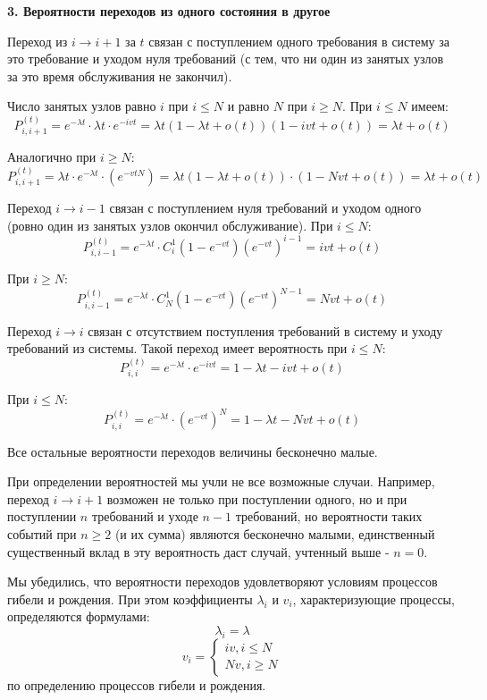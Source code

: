 \documentclass[aps,%
12pt,%
final,%
oneside,
onecolumn,%
musixtex, %
superscriptaddress,%
centertags]{article} %
\theoremstyle{plain}
\theoremstyle{definition}
\theoremstyle{remark}
\begin{document}
\textbf{3. Вероятности переходов из одного состояния в другое}

Переход из $i \to i+1$ за $t$ связан с поступлением одного требования в систему за это требование и уходом нуля требований (с тем, что ни один из занятых узлов за это время обслуживания не закончил).

Число занятых узлов равно $i$ при $i \leq N$ и равно $N$ при $i \geq N$. При $i \leq N$ имеем:
$$P_{i,i+1}^{(t)} = e^{-\lambda t} \cdot \lambda t \cdot e^{-ivt} = \lambda t (1-\lambda t + o(t))(1-ivt+o(t)) = \lambda t + o(t)$$

Аналогично при $i \geq N$: 
$$P_{i,i+1}^{(t)} = \lambda t \cdot e^{-\lambda t} \cdot (e^{-vtN}) = \lambda t(1-\lambda t +o(t)) \cdot (1-Nvt +o(t)) = \lambda t + o(t)$$

Переход $i \to i-1$ связан с поступлением нуля требований и уходом одного (ровно один из занятых узлов окончил обслуживание). При $i \leq N$:
$$P_{i,i-1}^{(t)} = e^{-\lambda t}\cdot C_i^1 (1-e^{-vt})\left(e^{-vt}\right)^{i-1} = ivt + o(t)$$

При $i \geq N$:
$$P_{i,i-1}^{(t)} = e^{-\lambda t}\cdot C_N^1 (1-e^{-vt})\left(e^{-vt}\right)^{N-1} = Nvt + o(t)$$

Переход $i \to i$ связан с отсутствием поступления требований в систему и уходу требований из системы. Такой переход имеет вероятность при $i \leq N$:
$$P_{i,i}^{(t)} = e^{-\lambda t}\cdot e^{-ivt} = 1 - \lambda t - ivt +o(t)$$

При $i \leq N$:
$$P_{i,i}^{(t)} = e^{-\lambda t} \cdot (e^{-vt})^N = 1-\lambda t - Nvt +o(t)$$

Все остальные вероятности переходов величины бесконечно малые.

При определении вероятностей мы учли не все возможные случаи. Например, переход $i \to i +1$ возможен не только при поступлении одного, но и при поступлении $n$ требований и уходе $n-1$ требований, но вероятности таких событий при $n \geq 2$ (и их сумма) являются бесконечно малыми, единственный существенный вклад в эту вероятность даст случай, учтенный выше - $n=0$.

Мы убедились, что вероятности переходов удовлетворяют условиям процессов гибели и рождения. При этом коэффициенты $\lambda_i$ и $v_i$, характеризующие процессы, определяются формулами:
$$ \lambda_i  = \lambda$$
$$v_i = \begin{cases}
	iv, i \leq N \\
	Nv, i \geq N
\end{cases}$$
по определению процессов гибели и рождения.
\end{document}

